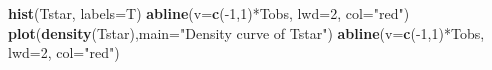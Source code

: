 \documentclass[]{book}
\newenvironment{Shaded}{\begin{snugshade}}{\end{snugshade}}
\newcommand{\KeywordTok}[1]{\textcolor[rgb]{0.13,0.29,0.53}{\textbf{{#1}}}}
\newcommand{\DataTypeTok}[1]{\textcolor[rgb]{0.13,0.29,0.53}{{#1}}}
\newcommand{\DecValTok}[1]{\textcolor[rgb]{0.00,0.00,0.81}{{#1}}}
\newcommand{\StringTok}[1]{\textcolor[rgb]{0.31,0.60,0.02}{{#1}}}
\newcommand{\NormalTok}[1]{{#1}}
\begin{document}
\begin{Shaded}
\begin{Highlighting}[]
\KeywordTok{hist}\NormalTok{(Tstar, }\DataTypeTok{labels=}\NormalTok{T)}
\KeywordTok{abline}\NormalTok{(}\DataTypeTok{v=}\KeywordTok{c}\NormalTok{(-}\DecValTok{1}\NormalTok{,}\DecValTok{1}\NormalTok{)*Tobs, }\DataTypeTok{lwd=}\DecValTok{2}\NormalTok{, }\DataTypeTok{col=}\StringTok{"red"}\NormalTok{)}
\KeywordTok{plot}\NormalTok{(}\KeywordTok{density}\NormalTok{(Tstar),}\DataTypeTok{main=}\StringTok{"Density curve of Tstar"}\NormalTok{)}
\KeywordTok{abline}\NormalTok{(}\DataTypeTok{v=}\KeywordTok{c}\NormalTok{(-}\DecValTok{1}\NormalTok{,}\DecValTok{1}\NormalTok{)*Tobs, }\DataTypeTok{lwd=}\DecValTok{2}\NormalTok{, }\DataTypeTok{col=}\StringTok{"red"}\NormalTok{)}
\end{Highlighting}
\end{Shaded}
\end{document}
